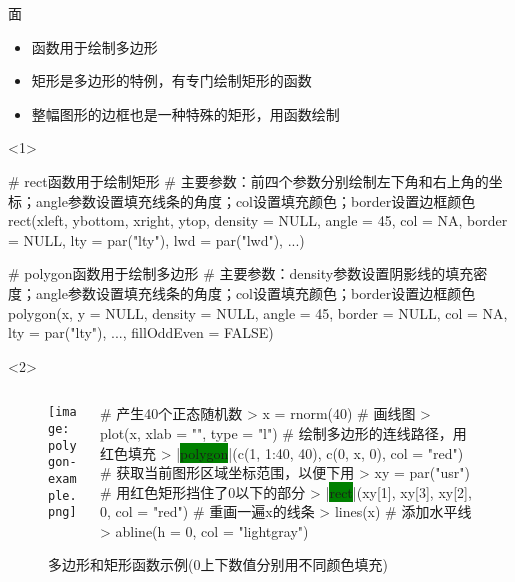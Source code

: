\begin{frame}[t,fragile]{\subsecname}{面}
\begin{itemize}
\item {}函数用于绘制多边形
\item 矩形是多边形的特例，有专门绘制矩形的函数
\item 整幅图形的边框也是一种特殊的矩形，用函数绘制
\end{itemize}

\begin{onlyenv}<1>
\begin{rcode}
# rect函数用于绘制矩形
# 主要参数：前四个参数分别绘制左下角和右上角的坐标；angle参数设置填充线条的角度；col设置填充颜色；border设置边框颜色
rect(xleft, ybottom, xright, ytop, density = NULL, angle = 45, col = NA, border = NULL, lty = par("lty"), lwd = par("lwd"), ...)
\end{rcode}
\begin{rcode}
# polygon函数用于绘制多边形
# 主要参数：density参数设置阴影线的填充密度；angle参数设置填充线条的角度；col设置填充颜色；border设置边框颜色
polygon(x, y = NULL, density = NULL, angle = 45, border = NULL, col = NA, lty = par("lty"), ..., fillOddEven = FALSE)
\end{rcode}
\end{onlyenv}

\begin{onlyenv}<2>
\begin{figure}
 \begin{columns}
    \begin{column}[c]{.4\textwidth}
        \texttt{[image: polygon-example.png]}
    \end{column}

    \begin{column}[c]{.6\textwidth}
\begin{rcode}
# 产生40个正态随机数
> x = rnorm(40)
# 画线图
> plot(x, xlab = "", type = "l")
# 绘制多边形的连线路径，用红色填充
> |\colorbox{green}{polygon}|(c(1, 1:40, 40), c(0, x, 0), col = "red")
# 获取当前图形区域坐标范围，以便下用
> xy = par("usr")
# 用红色矩形挡住了0以下的部分
> |\colorbox{green}{rect}|(xy[1], xy[3], xy[2], 0, col = "red")
# 重画一遍x的线条
> lines(x)
# 添加水平线
> abline(h = 0, col = "lightgray")
\end{rcode}
    \end{column}
  \end{columns}
  \caption{多边形和矩形函数示例(0上下数值分别用不同颜色填充)}
\end{figure}
\end{onlyenv}  
\end{frame}

